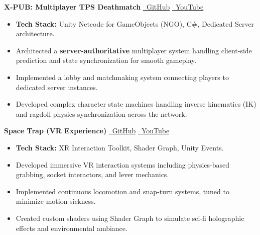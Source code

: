 \documentclass[10pt, letterpaper]{article}
\newenvironment{highlights}{
    \begin{itemize}[topsep=0.05cm, parsep=0.05cm, itemsep=0pt, leftmargin=10pt]
}{
    \end{itemize}
}
\begin{document}
\vspace{0.2cm}
\begin{twocolentry}{
    \textbf{X-PUB: Multiplayer TPS Deathmatch}
}
    \hfill  
    \href{https://github.com/hashiq-11/X-PUB}{\faGithub~GitHub} \quad
    \href{https://youtu.be/i1-ipBZLx1E}{\faYoutube~YouTube}
\end{twocolentry}

\vspace{0.1 cm}

\begin{onecolentry}
    \begin{highlights}
        \item \textbf{Tech Stack:} Unity Netcode for GameObjects (NGO), C\#, Dedicated Server architecture.
        \item Architected a \textbf{server-authoritative} multiplayer system handling client-side prediction and state synchronization for smooth gameplay.
        \item Implemented a lobby and matchmaking system connecting players to dedicated server instances.
        \item Developed complex character state machines handling inverse kinematics (IK) and ragdoll physics synchronization across the network.
    \end{highlights}
\end{onecolentry}


\vspace{0.3cm}
\begin{twocolentry}{
    \textbf{Space Trap (VR Experience)}
}
    \hfill  
    \href{https://github.com/hashiq-11/Space-Trap-VR-}{\faGithub~GitHub} \quad
    \href{https://youtu.be/C1SJOTPFX9Q}{\faYoutube~YouTube}
\end{twocolentry}

\vspace{0.1 cm}

\begin{onecolentry}
    \begin{highlights}
        \item \textbf{Tech Stack:} XR Interaction Toolkit, Shader Graph, Unity Events.
        \item Developed immersive VR interaction systems including physics-based grabbing, socket interactors, and lever mechanics.
        \item Implemented continuous locomotion and snap-turn systems, tuned to minimize motion sickness.
        \item Created custom shaders using Shader Graph to simulate sci-fi holographic effects and environmental ambiance.
    \end{highlights}
\end{onecolentry}
\end{document}
